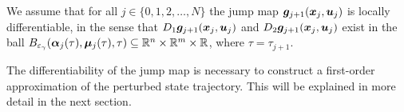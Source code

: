 \documentclass[../DC2017114Bouma.tex]{subfiles}
\begin{document}
\begin{sloppypar}
\begin{myass}\label{ass:jump}
We assume that for all $j \in \{0,1,2,\dots,N\}$ the jump map ${\boldsymbol{g}}_{j+1}({\boldsymbol{x}}_j,{\boldsymbol{u}}_j)$ is locally differentiable, in the sense that $D_1{\boldsymbol{g}}_{j+1}({\boldsymbol{x}}_j,{\boldsymbol{u}}_j)$ and $D_2{\boldsymbol{g}}_{j+1}({\boldsymbol{x}}_j,{\boldsymbol{u}}_j)$ exist in the ball $B_{\varepsilon_{\gamma}}(\boldsymbol{\alpha}_j(\tau),\boldsymbol{\mu}_j(\tau),\tau)\subseteq \mathbb{R}^n \times \mathbb{R}^m \times \mathbb{R}$, where $\tau = \tau_{j+1}$.
\end{myass}
\end{sloppypar}

The differentiability of the jump map is necessary to construct a first-order approximation of the perturbed state trajectory. This will be explained in more detail in the next section.
\end{document}
